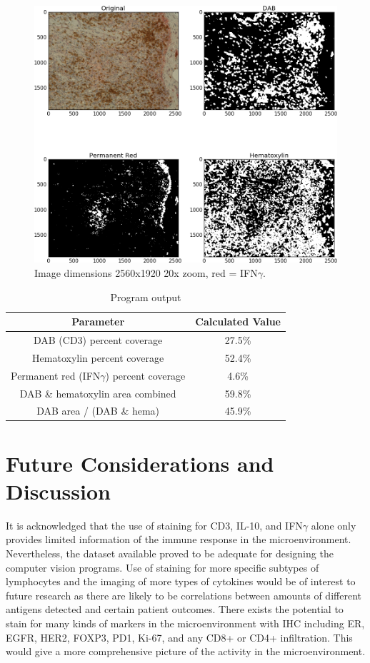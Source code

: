 \documentclass[12pt]{article}
\begin{document}
\begin{figure}[H]
  \includegraphics[width=\linewidth]{12_IFNg_20x.png}
  \caption{Image dimensions 2560x1920
20x zoom, red = IFN$\gamma$.}
  \label{fig:12 IFNg}
\end{figure}


\begin{table}[H]
\centering
\caption{Program output}
\label{program output}
\begin{tabular}{|c|c|}
\hline
\textbf{Parameter} & \textbf{Calculated Value} \\ \hline
DAB (CD3) percent coverage & 27.5\% \\ \hline
Hematoxylin percent coverage & 52.4\% \\ \hline
Permanent red (IFN$\gamma$) percent coverage & 4.6\% \\ \hline
DAB \& hematoxylin area combined & 59.8\% \\ \hline
DAB area / (DAB \& hema) & 45.9\% \\ \hline
\end{tabular}
\end{table}


\section*{Future Considerations and Discussion}

It is acknowledged that the use of staining for CD3, IL-10, and IFN$\gamma$ alone only provides
limited information of the immune response in the microenvironment. Nevertheless, the dataset
available proved to be adequate for designing the computer vision programs. Use of staining for more
specific subtypes of lymphocytes and the imaging of more types of cytokines would be of interest to
future research as there are likely to be correlations between amounts of different antigens detected and certain patient outcomes. There exists the potential to stain for many kinds of markers in the microenvironment with IHC including ER, EGFR, HER2, FOXP3, PD1, Ki-67, and any CD8+ or
CD4+ infiltration. This would give a more comprehensive picture of the activity in the
microenvironment.
\end{document}
